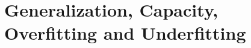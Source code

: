 \documentclass{beamer}
\DeclareMathOperator*{\argmin}{arg\,min}
\begin{document}
%
%
%
%

\section{Generalization, Capacity, Overfitting and Underfitting}

%
\end{document}
